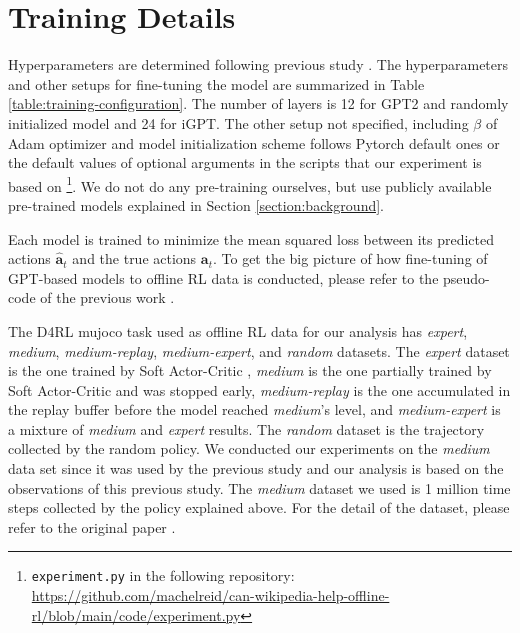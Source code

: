 \documentclass{article}
\begin{document}
\section{Training Details}
\label{appendix:training-detail}
Hyperparameters are determined following previous study \cite{reid2022can}. The hyperparameters and other setups for fine-tuning the model are summarized in Table \ref{table:training-configuration}. The number of layers is 12 for GPT2 and randomly initialized model and 24 for iGPT. The other setup not specified, including $\beta$ of Adam optimizer \cite{KingmaB14} and model initialization scheme follows Pytorch default ones or the default values of optional arguments in the scripts that our experiment is based on \footnote{\lstinline{experiment.py} in the following repository:\\
\href{https://github.com/machelreid/can-wikipedia-help-offline-rl/blob/main/code/experiment.py}{https://github.com/machelreid/can-wikipedia-help-offline-rl/blob/main/code/experiment.py}}. We do not do any pre-training ourselves, but use publicly available pre-trained models explained in Section \ref{section:background}. 

Each model is trained to minimize the mean squared loss between its predicted actions $\hat{\bm{a}}_t$ and the true actions $\bm{a}_t$. To get the big picture of how fine-tuning of GPT-based models to offline RL data is conducted, please refer to the pseudo-code of the previous work \cite{chen2021decision}.

The D4RL mujoco task used as offline RL data for our analysis has \textit{expert}, \textit{medium}, \textit{medium-replay}, \textit{medium-expert}, and \textit{random} datasets. The \textit{expert} dataset is the one trained by Soft Actor-Critic \cite{haarnoja2018soft}, \textit{medium} is the one partially trained by Soft Actor-Critic and was stopped early, \textit{medium-replay} is the one accumulated in the replay buffer before the model reached \textit{medium}'s level, and \textit{medium-expert} is a mixture of \textit{medium} and \textit{expert} results. The \textit{random} dataset is the trajectory collected by the random policy. We conducted our experiments on the \textit{medium} data set since it was used by the previous study \cite{reid2022can} and our analysis is based on the observations of this previous study.
The \textit{medium} dataset we used is 1 million time steps collected by the policy explained above. For the detail of the dataset, please refer to the original paper \cite{fu2020d4rl}.
\end{document}
